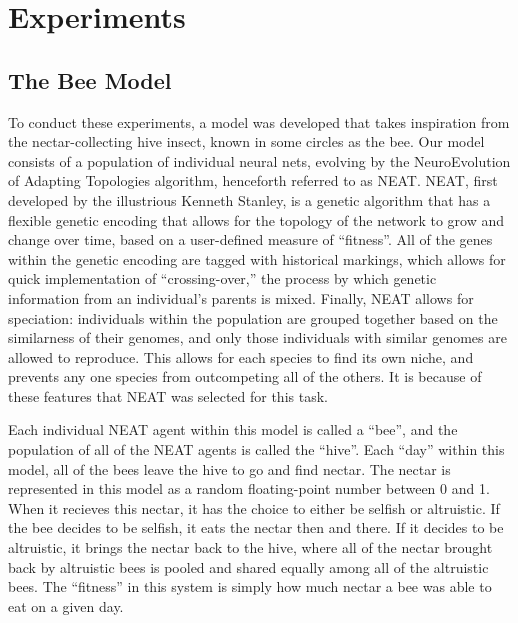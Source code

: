 \documentclass[11pt]{article}
\begin{document}
	\section{Experiments} %
	\label{sec:experiments}

		\subsection{The Bee Model} %
		\label{sub:the_bee_model}
			To conduct these experiments, a model was developed that takes inspiration from the nectar-collecting hive insect, known in some circles as the bee. Our model consists of a population of individual neural nets, evolving by the NeuroEvolution of Adapting Topologies algorithm, henceforth referred to as NEAT.\cite{neat} NEAT, first developed by the illustrious Kenneth Stanley, is a genetic algorithm that has a flexible genetic encoding that allows for the topology of the network to grow and change over time, based on a user-defined measure of ``fitness''. All of the genes within the genetic encoding are tagged with historical markings, which allows for quick implementation of ``crossing-over,'' the process by which genetic information from an individual's parents is mixed. Finally, NEAT allows for speciation: individuals within the population are grouped together based on the similarness of their genomes, and only those individuals with similar genomes are allowed to reproduce. This allows for each species to find its own niche, and prevents any one species from outcompeting all of the others. It is because of these features that NEAT was selected for this task.

			Each individual NEAT agent within this model is called a ``bee'', and the population of all of the NEAT agents is called the ``hive''. Each ``day'' within this model, all of the bees leave the hive to go and find nectar. The nectar is represented in this model as a random floating-point number between 0 and 1. When it recieves this nectar, it has the choice to either be selfish or altruistic. If the bee decides to be selfish, it eats the nectar then and there. If it decides to be altruistic, it brings the nectar back to the hive, where all of the nectar brought back by altruistic bees is pooled and shared equally among all of the altruistic bees. The ``fitness'' in this system is simply how much nectar a bee was able to eat on a given day.
\end{document}
